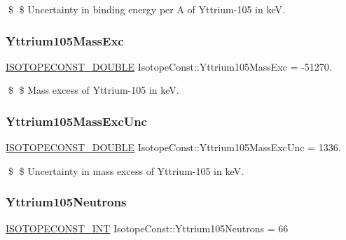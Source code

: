 \$ \$ Uncertainty in binding energy per A of Yttrium-\/105 in keV. \mbox{\label{group___isotope_const-_yttrium-_y105_ga0a3a24ea4659483e68917f47fb837421}} 
\subsubsection{\texorpdfstring{Yttrium105\+Mass\+Exc}{Yttrium105MassExc}}
{\footnotesize\ttfamily \mbox{\hyperlink{group___isotope_const-_macros_ga8f45a7272ce02c0b4c65c44636ed719a}{I\+S\+O\+T\+O\+P\+E\+C\+O\+N\+S\+T\+\_\+\+D\+O\+U\+B\+LE}} Isotope\+Const\+::\+Yttrium105\+Mass\+Exc = -\/51270.}

\$ \$ Mass excess of Yttrium-\/105 in keV. \mbox{\label{group___isotope_const-_yttrium-_y105_gad5e8e36e63bd3be68687119e122a2b6a}} 
\subsubsection{\texorpdfstring{Yttrium105\+Mass\+Exc\+Unc}{Yttrium105MassExcUnc}}
{\footnotesize\ttfamily \mbox{\hyperlink{group___isotope_const-_macros_ga8f45a7272ce02c0b4c65c44636ed719a}{I\+S\+O\+T\+O\+P\+E\+C\+O\+N\+S\+T\+\_\+\+D\+O\+U\+B\+LE}} Isotope\+Const\+::\+Yttrium105\+Mass\+Exc\+Unc = 1336.}

\$ \$ Uncertainty in mass excess of Yttrium-\/105 in keV. \mbox{\label{group___isotope_const-_yttrium-_y105_gaede6cfff914f85f6df99a9271c6aea81}} 
\subsubsection{\texorpdfstring{Yttrium105\+Neutrons}{Yttrium105Neutrons}}
{\footnotesize\ttfamily \mbox{\hyperlink{group___isotope_const-_macros_ga5f18360b3e99483a35c32d789e62621c}{I\+S\+O\+T\+O\+P\+E\+C\+O\+N\+S\+T\+\_\+\+I\+NT}} Isotope\+Const\+::\+Yttrium105\+Neutrons = 66}

